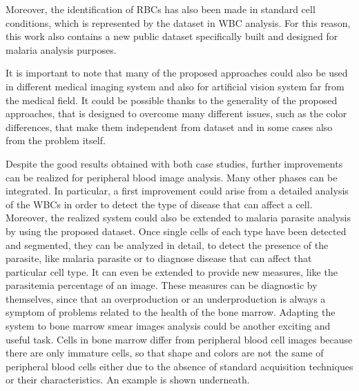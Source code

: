 Moreover, the identification of RBCs has also been made in standard cell conditions, which is represented by the dataset in WBC analysis. For this reason, this work also contains a new public dataset specifically built and designed for malaria analysis purposes.

It is important to note that many of the proposed approaches could also be used in different medical imaging system and also for artificial vision system far from the medical field. It could be possible thanks to the generality of the proposed approaches, that is designed to overcome many different issues, such as the color differences, that make them independent from dataset and in some cases also from the problem itself.

Despite the good results obtained with both case studies, further improvements can be realized for peripheral blood image analysis. Many other phases can be integrated. 
In particular, a first improvement could arise from a detailed analysis of the WBCs in order to detect the type of disease that can affect a cell. 
Moreover, the realized system could also be extended to malaria parasite analysis by using the proposed dataset. Once single cells of each type have been detected and segmented, they can be analyzed in detail, to detect the presence of the parasite, like malaria parasite or to diagnose disease that can affect that particular cell type.   
It can even be extended to provide new measures, like the parasitemia percentage of an image.
These measures can be diagnostic by themselves, since that an overproduction or an underproduction is always a symptom of problems related to the health of the bone marrow. Adapting the system to bone marrow smear images analysis could be another exciting and useful task. Cells in bone marrow differ from peripheral blood cell images because there are only immature cells, so that shape and colors are not the same of peripheral blood cells either due to the absence of standard acquisition techniques or their characteristics. An example is shown underneath.

